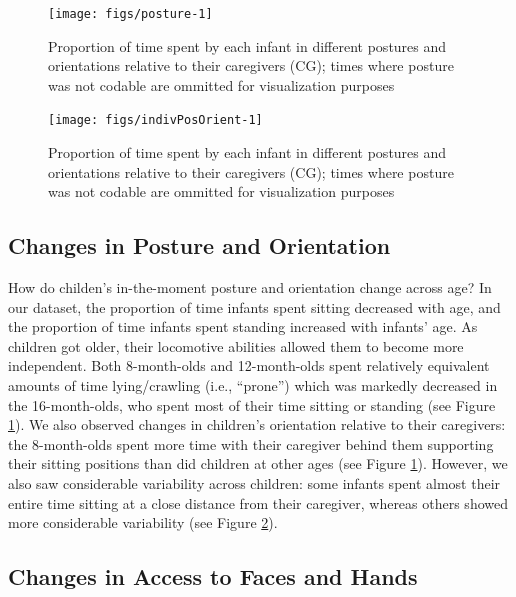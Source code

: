 \documentclass[english,man,floatsintext,draftall]{apa6}
\begin{document}
\begin{figure}[h]

{\centering \texttt{[image: figs/posture-1]} 

}

\caption{Proportion of time spent by each infant in different postures and orientations relative to their caregivers (CG); times where posture was not codable are ommitted for visualization purposes}\label{fig:posture}
\end{figure}

\begin{figure}[h]

{\centering \texttt{[image: figs/indivPosOrient-1]} 

}

\caption{Proportion of time spent by each infant in different postures and orientations relative to their caregivers (CG); times where posture was not codable are ommitted for visualization purposes}\label{fig:indivPosOrient}
\end{figure}

\subsection{Changes in Posture and
Orientation}\label{changes-in-posture-and-orientation}

How do childen's in-the-moment posture and orientation change across
age? In our dataset, the proportion of time infants spent sitting
decreased with age, and the proportion of time infants spent standing
increased with infants' age. As children got older, their locomotive
abilities allowed them to become more independent. Both 8-month-olds and
12-month-olds spent relatively equivalent amounts of time lying/crawling
(i.e., \enquote{prone}) which was markedly decreased in the
16-month-olds, who spent most of their time sitting or standing (see
Figure \ref{fig:posture}). We also observed changes in children's
orientation relative to their caregivers: the 8-month-olds spent more
time with their caregiver behind them supporting their sitting positions
than did children at other ages (see Figure \ref{fig:posture}). However,
we also saw considerable variability across children: some infants spent
almost their entire time sitting at a close distance from their
caregiver, whereas others showed more considerable variability (see
Figure \ref{fig:indivPosOrient}).

\subsection{Changes in Access to Faces and
Hands}\label{changes-in-access-to-faces-and-hands}
\end{document}
